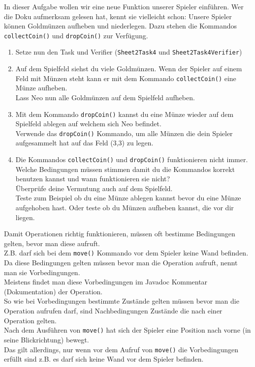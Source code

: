 

In dieser Aufgabe wollen wir eine neue Funktion unserer Spieler einführen. 
Wer die Doku aufmerksam gelesen hat, kennt sie vielleicht schon:
Unsere Spieler können Goldmünzen aufheben und niederlegen. 
Dazu stehen die Kommandos \lstinline{collectCoin()} und \lstinline{dropCoin()} zur Verfügung.

\begin{enumerate}
    \item Setze nun den Task und Verifier (\lstinline{Sheet2Task4} und \lstinline{Sheet2Task4Verifier})
    \item Auf dem Spielfeld siehst du viele Goldmünzen.
        Wenn der Spieler auf einem Feld mit Münzen steht kann er mit dem Kommando \lstinline{collectCoin()} eine Münze aufheben.\\
        Lass Neo nun alle Goldmünzen auf dem Spielfeld aufheben.
    \item Mit dem Kommando \lstinline{dropCoin()} kannst du eine Münze wieder auf dem Spielfeld ablegen auf welchem sich Neo befindet.\\
        Verwende das \lstinline{dropCoin()} Kommando, um alle Münzen die dein Spieler aufgesammelt hat auf das Feld (3,3) zu legen.
    \item Die Kommandos \lstinline{collectCoin()} und \lstinline{dropCoin()} funktionieren nicht immer.
        Welche Bedingungen müssen stimmen damit du die Kommandos korrekt benutzen kannst und wann funktionieren sie nicht?\\
        Überprüfe deine Vermutung auch auf dem Spielfeld.\\
        Teste zum Beispiel ob du eine Münze ablegen kannst bevor du eine Münze aufgehoben hast.
        Oder teste ob du Münzen aufheben kannst, die vor dir liegen.
\end{enumerate}


\begin{Infobox}
    Damit Operationen richtig funktionieren, müssen oft bestimme Bedingungen gelten, bevor man diese aufruft.\\
    Z.B. darf sich bei dem \lstinline{move()} Kommando vor dem Spieler keine Wand befinden.\\
    Da diese Bedingungen gelten müssen bevor man die Operation aufruft, nennt man sie Vorbedingungen.\\
    Meistens findet man diese Vorbedingungen im Javadoc Kommentar (Dokumentation) der Operation.\\

    So wie bei Vorbedingungen bestimmte Zustände gelten müssen bevor man die Operation aufrufen darf, sind Nachbedingungen Zustände die nach einer Operation gelten.\\
    Nach dem Ausführen von \lstinline{move()} hat sich der Spieler eine Position nach vorne (in seine Blickrichtung) bewegt.\\
    Das gilt allerdings, nur wenn vor dem Aufruf von \lstinline{move()} die Vorbedingungen erfüllt sind z.B. es darf sich keine Wand vor dem Spieler befinden.
\end{Infobox}
